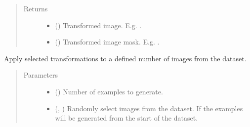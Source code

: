 \documentclass[letterpaper,10pt,english]{sphinxmanual}
\begin{document}
\begin{fulllineitems}
\begin{fulllineitems}
\begin{quote}
\begin{description}
\item[{Returns}] \leavevmode
\begin{itemize}
\item {} 
 () \textendash{} Transformed image. E.g. .

\item {} 
 () \textendash{} Transformed image mask. E.g. .

\end{itemize}


\end{description}\end{quote}

\end{fulllineitems}


\begin{fulllineitems}
\label{\detokenize{data/generators/3d_generator:data.generators.data_3D_generator.VoxelDataGenerator.get_transformed_samples}}
Apply selected transformations to a defined number of images from the dataset.
\begin{quote}\begin{description}
\item[{Parameters}] \leavevmode\begin{itemize}
\item {} 
 () \textendash{} Number of examples to generate.

\item {} 
 (, ) \textendash{} Randomly select images from the dataset. If  the examples will be generated from the start of
the dataset.


\end{itemize}
\end{description}
\end{quote}
\end{fulllineitems}
\end{fulllineitems}
\end{document}
